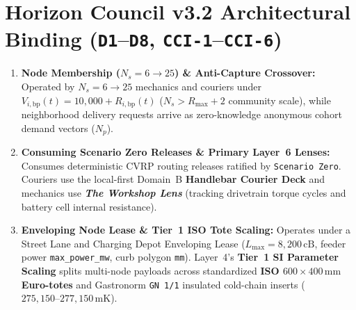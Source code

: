 \section{Horizon Council v3.2 Architectural Binding (\texttt{D1}--\texttt{D8}, \texttt{CCI-1}--\texttt{CCI-6})}
\begin{enumerate}
    \item \textbf{Node Membership ($N_s = 6 \to 25$) \& Anti-Capture Crossover:} Operated by $N_s = 6 \to 25$ mechanics and couriers under $V_{i,\mathrm{bp}}(t) = 10{,}000 + R_{i,\mathrm{bp}}(t)$ ($N_s > R_{\max} + 2$ community scale), while neighborhood delivery requests arrive as zero-knowledge anonymous cohort demand vectors ($N_p$).
    \item \textbf{Consuming Scenario Zero Releases \& Primary Layer~6 Lenses:} Consumes deterministic CVRP routing releases ratified by \texttt{Scenario Zero}. Couriers use the local-first Domain~B \textbf{Handlebar Courier Deck} and mechanics use \textbf{\textit{The Workshop Lens}} (tracking drivetrain torque cycles and battery cell internal resistance).
    \item \textbf{Enveloping Node Lease \& Tier~1 ISO Tote Scaling:} Operates under a Street Lane and Charging Depot Enveloping Lease ($L_{\max} = 8{,}200\,\mathrm{cB}$, feeder power \texttt{max\_power\_mw}, curb polygon \texttt{mm}). Layer~4's \textbf{Tier~1 SI Parameter Scaling} splits multi-node payloads across standardized \textbf{ISO $600 \times 400\,\mathrm{mm}$ Euro-totes} and Gastronorm \texttt{GN 1/1} insulated cold-chain inserts ($275{,}150\text{--}277{,}150\,\mathrm{mK}$).
\end{enumerate}

